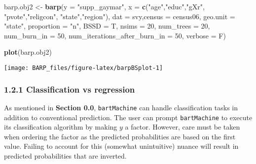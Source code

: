 \documentclass[]{article}
\newenvironment{Shaded}{\begin{snugshade}}{\end{snugshade}}
\newcommand{\KeywordTok}[1]{\textcolor[rgb]{0.13,0.29,0.53}{\textbf{#1}}}
\newcommand{\DataTypeTok}[1]{\textcolor[rgb]{0.13,0.29,0.53}{#1}}
\newcommand{\DecValTok}[1]{\textcolor[rgb]{0.00,0.00,0.81}{#1}}
\newcommand{\StringTok}[1]{\textcolor[rgb]{0.31,0.60,0.02}{#1}}
\newcommand{\NormalTok}[1]{#1}
\begin{document}
\begin{Shaded}
\begin{Highlighting}[]
\NormalTok{barp.obj2 <-}\StringTok{ }\KeywordTok{barp}\NormalTok{(}\DataTypeTok{y =} \StringTok{"supp_gaymar"}\NormalTok{,}
                  \DataTypeTok{x =} \KeywordTok{c}\NormalTok{(}\StringTok{"age"}\NormalTok{,}\StringTok{"educ"}\NormalTok{,}\StringTok{"gXr"}\NormalTok{,}
                       \StringTok{"pvote"}\NormalTok{,}\StringTok{"religcon"}\NormalTok{,}
                       \StringTok{"state"}\NormalTok{,}\StringTok{"region"}\NormalTok{),}
                  \DataTypeTok{dat =}\NormalTok{ svy,}\DataTypeTok{census =}\NormalTok{ census06,}
                  \DataTypeTok{geo.unit =} \StringTok{"state"}\NormalTok{,}
                  \DataTypeTok{proportion =} \StringTok{"n"}\NormalTok{,}
                  \DataTypeTok{BSSD =}\NormalTok{ T,}
                  \DataTypeTok{nsims =} \DecValTok{20}\NormalTok{,}
                  \DataTypeTok{num_trees =} \DecValTok{20}\NormalTok{,}
                  \DataTypeTok{num_burn_in =} \DecValTok{50}\NormalTok{,}
                  \DataTypeTok{num_iterations_after_burn_in =} \DecValTok{50}\NormalTok{,}
                  \DataTypeTok{verbose =}\NormalTok{ F)}
\end{Highlighting}
\end{Shaded}

\begin{Shaded}
\begin{Highlighting}[]
\KeywordTok{plot}\NormalTok{(barp.obj2)}
\end{Highlighting}
\end{Shaded}

\begin{center}\texttt{[image: BARP\_files/figure-latex/barpBSplot-1]} \end{center}

\subsubsection{1.2.1 Classification vs
regression}\label{classification-vs-regression}

As mentioned in \textbf{Section 0.0}, \texttt{bartMachine} can handle
classification tasks in addition to conventional prediction. The user
can prompt \texttt{bartMachine} to execute its classification algorithm
by making \(y\) a factor. However, care must be taken when ordering the
factor as the predicted probabilities are based on the first value.
Failing to account for this (somewhat unintuitive) nuance will result in
predicted probabilities that are inverted.
\end{document}
